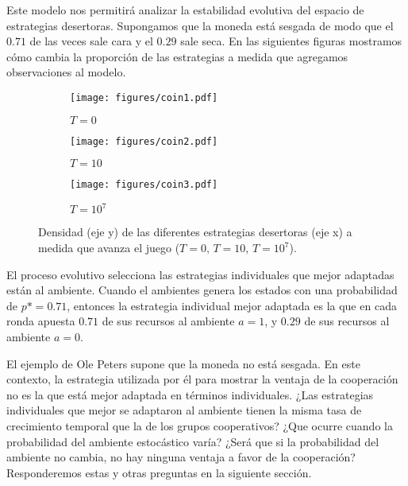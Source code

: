 \documentclass[a4paper,10pt]{article}
\begin{document}
%
Este modelo nos permitirá analizar la estabilidad evolutiva del espacio de estrategias desertoras. 
Supongamos que la moneda está sesgada de modo que el $0.71$ de las veces sale cara y el $0.29$ sale seca.
En las siguientes figuras mostramos cómo cambia la proporción de las estrategias a medida que agregamos observaciones al modelo.
%
\begin{figure}[H]
    \centering
    \begin{subfigure}[b]{0.32\textwidth}
    \texttt{[image: figures/coin1.pdf]}
    \caption{$T = 0$}
    \end{subfigure}
    \begin{subfigure}[b]{0.32\textwidth}
    \texttt{[image: figures/coin2.pdf]}
    \caption{$T = 10$}
    \end{subfigure}
    \begin{subfigure}[b]{0.32\textwidth}
    \texttt{[image: figures/coin3.pdf]}
    \caption{$T = 10^7$}
    \end{subfigure}
    \caption{Densidad (eje y) de las diferentes estrategias desertoras (eje x) a medida que avanza el juego ($T=0, \, T=10, \, T=10^7$).}
    \label{fig:estrategias_individuales}
\end{figure}

El proceso evolutivo selecciona las estrategias individuales que mejor adaptadas están al ambiente.
Cuando el ambientes genera los estados con una probabilidad de $p*=0.71$, entonces la estrategia individual mejor adaptada es la que en cada ronda apuesta $0.71$ de sus recursos al ambiente $a=1$, y $0.29$ de sus recursos al ambiente $a=0$.


El ejemplo de Ole Peters supone que la moneda no está sesgada.
En este contexto, la estrategia utilizada por él para mostrar la ventaja de la cooperación no es la que está mejor adaptada en términos individuales.
¿Las estrategias individuales que mejor se adaptaron al ambiente tienen la misma tasa de crecimiento temporal que la de los grupos cooperativos?
¿Que ocurre cuando la probabilidad del ambiente estocástico varía? 
¿Será que si la probabilidad del ambiente no cambia, no hay ninguna ventaja a favor de la cooperación?
Responderemos estas y otras preguntas en la siguiente sección.
\end{document}
